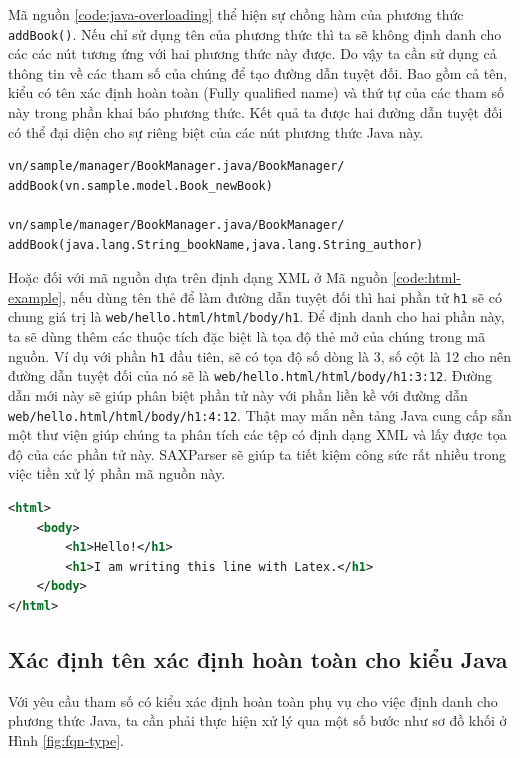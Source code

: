 \documentclass[12pt]{report}
\begin{document}
Mã nguồn \ref{code:java-overloading} thể hiện sự chồng hàm của phương thức \texttt{addBook()}. Nếu chỉ sử dụng tên của phương thức thì ta sẽ không định danh cho các các nút tương ứng với hai phương thức này được. Do vậy ta cần sử dụng cả thông tin về các tham số của chúng để tạo đường dẫn tuyệt đối. Bao gồm cả tên, kiểu có tên xác định hoàn toàn (Fully qualified name) và thứ tự của các tham số này trong phần khai báo phương thức. Kết quả ta được hai đường dẫn tuyệt đối có thể đại diện cho sự riêng biệt của các nút phương thức Java này.

\begin{verbatim}
vn/sample/manager/BookManager.java/BookManager/
addBook(vn.sample.model.Book_newBook)

vn/sample/manager/BookManager.java/BookManager/
addBook(java.lang.String_bookName,java.lang.String_author)
\end{verbatim}

Hoặc đối với mã nguồn dựa trên định dạng XML ở Mã nguồn \ref{code:html-example}, nếu dùng tên thẻ để làm đường dẫn tuyệt đối thì hai phần tử \texttt{h1} sẽ có chung giá trị là \texttt{web/hello.html/html/body/h1}. Để định danh cho hai phần này, ta sẽ dùng thêm các thuộc tích đặc biệt là tọa độ thẻ mở của chúng trong mã nguồn. Ví dụ với phần \texttt{h1} đầu tiên, sẽ có tọa độ số dòng là 3, số cột là 12 cho nên đường dẫn tuyệt đối của nó sẽ là \texttt{web/hello.html/html/body/h1:3:12}. Đường dẫn mới này sẽ giúp phân biệt phần tử này với phần liền kề với đường dẫn \texttt{web/hello.html/html/body/h1:4:12}. Thật may mắn nền tảng Java cung cấp sẵn một thư viện giúp chúng ta phân tích các tệp có định dạng XML và lấy được tọa độ của các phần tử này. SAXParser sẽ giúp ta tiết kiệm công sức rất nhiều trong việc tiền xử lý phần mã nguồn này.

\begin{lstlisting}[language=XML,
caption={Ví dụ mã nguồn HTML},label={code:html-example}]
<html>
	<body>
		<h1>Hello!</h1>
		<h1>I am writing this line with Latex.</h1>
	</body>
</html>
\end{lstlisting}

\subsection{Xác định tên xác định hoàn toàn cho kiểu Java}
Với yêu cầu tham số có kiểu xác định hoàn toàn phụ vụ cho việc định danh cho phương thức Java, ta cần phải thực hiện xử lý qua một số bước như sơ đồ khối ở Hình \ref{fig:fqn-type}.
\end{document}
